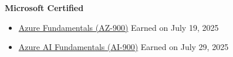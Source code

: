 \textbf{Microsoft Certified}
\begin{itemize}
    \item{
        \href{https://learn.microsoft.com/api/credentials/share/en-us/AlexanderSutila-2556/D24AED3333F099BE?sharingId=EB701E83F81470F9}{Azure Fundamentals (AZ-900)}
        \hfill Earned on July 19, 2025
    }
    \item{
        \href{https://learn.microsoft.com/api/credentials/share/en-us/AlexanderSutila-2556/A40D356FD5D21840?sharingId=EB701E83F81470F9}{Azure AI Fundamentals (AI-900)}
        \hfill Earned on July 29, 2025
    }
\end{itemize}
